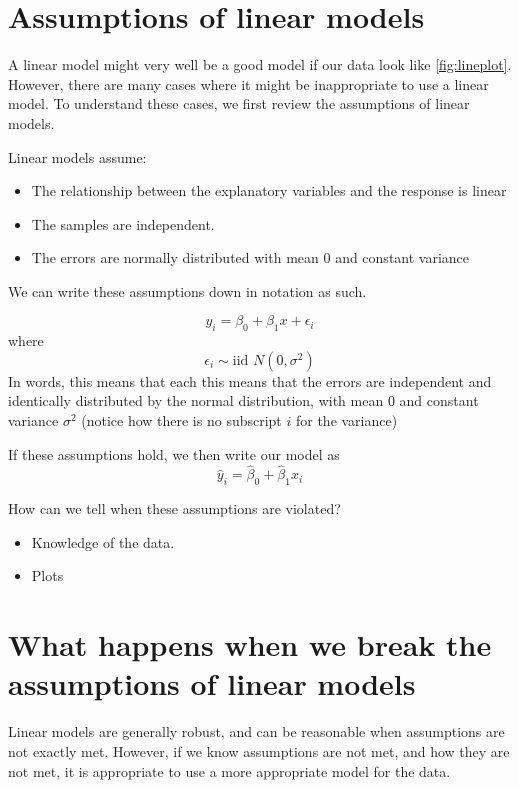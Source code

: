 \documentclass[
]{book}
\providecommand{\tightlist}{%
  \setlength{\itemsep}{0pt}\setlength{\parskip}{0pt}}
\begin{document}
\hypertarget{assumptions-of-linear-models}{%
\section{Assumptions of linear models}\label{assumptions-of-linear-models}}

A linear model might very well be a good model if our data look like \ref{fig:lineplot}. However, there are many cases where it might be inappropriate to use a linear model. To understand these cases, we first review the assumptions of linear models.

Linear models assume:

\begin{itemize}
\tightlist
\item
  The relationship between the explanatory variables and the response is linear
\item
  The samples are independent.
\item
  The errors are normally distributed with mean 0 and constant variance
\end{itemize}

We can write these assumptions down in notation as such.

\[y_i  = \beta_0 + \beta_1 x + \epsilon_i \]
where
\[ \epsilon_i \sim \text{iid } N(0,\sigma^2)\]
In words, this means that each
this means that the errors are independent and identically distributed by the normal distribution, with mean 0 and constant variance \(\sigma^2\) (notice how there is no subscript \(i\) for the variance)

If these assumptions hold, we then write our model as
\[ \hat y_i = \hat\beta_0 + \hat\beta_1 x_i\]

How can we tell when these assumptions are violated?

\begin{itemize}
\tightlist
\item
  Knowledge of the data.
\item
  Plots
\end{itemize}

\hypertarget{what-happens-when-we-break-the-assumptions-of-linear-models}{%
\section{What happens when we break the assumptions of linear models}\label{what-happens-when-we-break-the-assumptions-of-linear-models}}

Linear models are generally robust, and can be reasonable when assumptions are not exactly met. However, if we know assumptions are not met, and how they are not met, it is appropriate to use a more appropriate model for the data.
\end{document}
